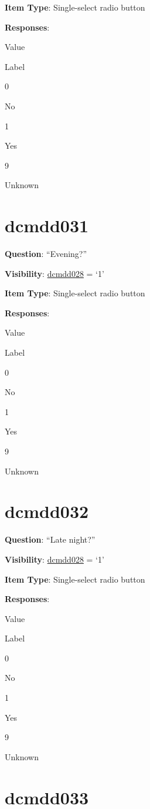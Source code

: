 \documentclass[]{book}
\begin{document}
\textbf{Item Type}: Single-select radio button

\textbf{Responses}:

Value

Label

0

No

1

Yes

9

Unknown

\hypertarget{dcmdd031}{%
\section{dcmdd031}\label{dcmdd031}}

\textbf{Question}: ``Evening?''

\textbf{Visibility}: \protect\hyperlink{dcmdd028}{dcmdd028} = `1'

\textbf{Item Type}: Single-select radio button

\textbf{Responses}:

Value

Label

0

No

1

Yes

9

Unknown

\hypertarget{dcmdd032}{%
\section{dcmdd032}\label{dcmdd032}}

\textbf{Question}: ``Late night?''

\textbf{Visibility}: \protect\hyperlink{dcmdd028}{dcmdd028} = `1'

\textbf{Item Type}: Single-select radio button

\textbf{Responses}:

Value

Label

0

No

1

Yes

9

Unknown

\hypertarget{dcmdd033}{%
\section{dcmdd033}\label{dcmdd033}}
\end{document}
